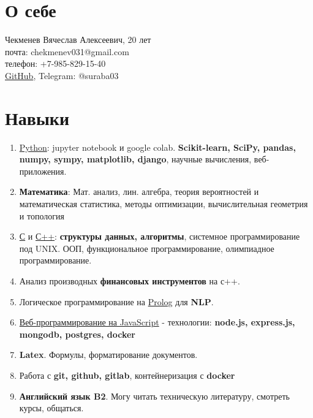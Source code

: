 \documentclass[a4paper,10pt]{report}
\date{}
\begin{document}
\section{О себе}
      \large Чекменев Вячеслав Алексеевич, 20 лет\\
      \large почта: chekmenev031@gmail.com \\
      \large телефон: +7-985-829-15-40 \\
      \large \href{https://github.com/Suraba03}{GitHub}, Telegram: @suraba03\\
\section{Навыки}
\begin{enumerate}
    \item \underline{Python}: jupyter notebook и google colab. \textbf{Scikit-learn, SciPy, pandas, numpy, sympy, matplotlib, django}, научные вычисления, веб-приложения.
    \item \textbf{Математика}: Мат. анализ, лин. алгебра, теория вероятностей и математическая статистика, методы оптимизации, вычислительная геометрия и топология
    \item \underline{С} и \underline{С++}: \textbf{структуры данных, алгоритмы}, системное программирование под UNIX. ООП, функциональное программирование, олимпиадное программирование. 
    \item Анализ производных \textbf{финансовых инструментов} на с++.
    \item Логическое программирование на \underline{Prolog} для \textbf{NLP}.
    \item \underline{Веб-программирование на JavaScript} - технологии: \textbf{node.js, express.js, mongodb, postgres, docker}
    \item \textbf{Latex}. Формулы, форматирование документов.
    \item Работа с \textbf{git, github, gitlab}, контейнеризация с \textbf{docker}
    \item \textbf{Английский язык B2}. Могу читать техническую литературу, смотреть курсы, общаться.
\end{enumerate}
\end{document}
